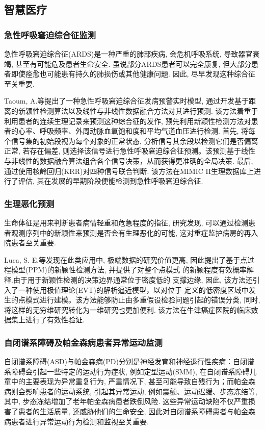 \documentclass{Style/aas}
\begin{document}
\begin{multicols}{2}
  \subsection{智慧医疗}
  \subsubsection{急性呼吸窘迫综合征监测}
  急性呼吸窘迫综合征(ARDS)是一种严重的肺部疾病, 会危机呼吸系统, 导致器官衰竭, 甚至有可能危及患者生命安全. 虽说部分ARDS患者可以完全康复, 但大部分患者即使痊愈也可能患有持久的肺损伤或其他健康问题. 因此, 尽早发现这种综合征至关重要.

  Taoum, A.等\cite{taoum2018early}提出了一种急性呼吸窘迫综合征发病预警实时模型, 通过开发基于距离的新颖性检测算法以及线性与非线性数据融合方法对其进行预测. 该方法着重于利用患者的连续生理记录来预测这种综合征的发作, 预先利用新颖性检测方法对患者的心率、呼吸频率、外周动脉血氧饱和度和平均气道血压进行检测. 首先, 将每个信号集的初始段视为每个对象的正常状态, 分析信号其余段以检测它们是否偏离正常, 若存在偏差, 则选择该信号进行急性呼吸窘迫综合征预测。该预测基于线性与非线性的数据融合算法组合各个信号决策，从而获得更准确的全局决策. 最后, 通过使用核岭回归(KRR)对四种信号联合判断. 该方法在MIMIC II生理数据库上进行了评估, 其在发展的早期阶段便能检测到急性呼吸窘迫综合征.


  \subsubsection{生理恶化预测}
  生命体征是用来判断患者病情轻重和危急程度的指征, 研究发现, 可以通过检测患者观测序列中的新颖性来预测是否会有生理恶化的可能, 这对重症监护病房的再入院患者至关重要.

  Luca, S. E.等\cite{luca2018point}发现在此类应用中, 极端数据的研究价值更高, 因此提出了基于点过程模型(PPM)\cite{li2017multimode}的新颖性检测方法, 并提供了对整个点模式 的新颖程度有效概率解释.由于用于新颖性检测的决策边界通常位于密度低的 支撑边缘, 因此, 该方法还引入了一种使用极值理论(EVT)的解析逼近模型，以对位于 定义的低密度区域中发生的点模式进行建模。该方法能够防止由多重假设检验问题引起的错误分类, 同时, 将这样的无穷维研究转化为一维研究也更加便利. 该方法在牛津癌症医院的临床数据集上进行了有效性验证.

  \subsubsection{自闭谱系障碍及帕金森病患者异常运动监测}
  自闭谱系障碍(ASD)与帕金森病(PD)分别是神经发育和神经退行性疾病：自闭谱系障碍会引起一些特定的运动行为症状, 例如定型运动(SMM), 在自闭谱系障碍儿童中的主要表现为异常重复行为, 严重情况下, 甚至可能导致自残行为；而帕金森病则会影响患者的运动系统, 引起其异常运动, 例如震颤、运动迟缓、步态冻结等\cite{mohammadian2018novelty}, 其中, 步态冻结增加了老年帕金森病患者跌倒风险. 这些异常运动缺陷不仅严重损害了患者的生活质量, 还威胁他们的生命安全, 因此对自闭谱系障碍患者与帕金森病患者进行异常运动行为检测和监视至关重要.


\end{multicols}
\end{document}
